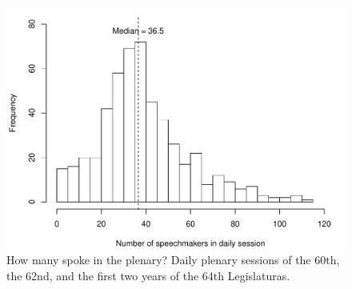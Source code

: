 \documentclass[letter,12pt]{article}
\begin{document}
\begin{figure}
  \centering
    \includegraphics[width=.8\columnwidth]{../plots/nspeakers.pdf}
    \caption{How many spoke in the plenary? Daily plenary sessions of the 60th, the 62nd, and the first two years of the 64th Legislaturas.}\label{F:nspeakers}
\end{figure}





\listofendnotes








\end{document}

